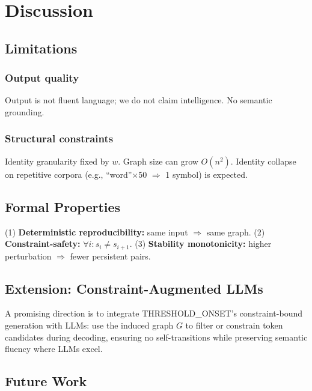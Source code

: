 \documentclass[10pt]{article}
\begin{document}
\section{Discussion}
\label{sec:discussion}

\subsection{Limitations}

\subsubsection{Output quality}
Output is not fluent language; we do not claim intelligence. No semantic grounding.

\subsubsection{Structural constraints}
Identity granularity fixed by $w$. Graph size can grow $O(n^2)$. Identity collapse on repetitive corpora (e.g., ``word''$\times$50 $\Rightarrow$ 1 symbol) is expected.

\subsection{Formal Properties}

(1) \textbf{Deterministic reproducibility:} same input $\Rightarrow$ same graph. (2) \textbf{Constraint-safety:} $\forall i: s_i \neq s_{i+1}$. (3) \textbf{Stability monotonicity:} higher perturbation $\Rightarrow$ fewer persistent pairs.

\subsection{Extension: Constraint-Augmented LLMs}

A promising direction is to integrate THRESHOLD\_ONSET's constraint-bound generation with LLMs: use the induced graph $G$ to filter or constrain token candidates during decoding, ensuring no self-transitions while preserving semantic fluency where LLMs excel.

\subsection{Future Work}
\end{document}

